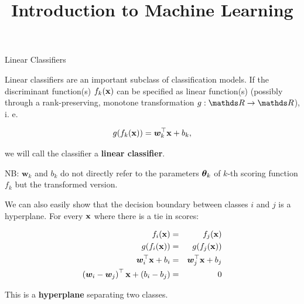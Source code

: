 \documentclass[11pt,compress,t,notes=noshow, xcolor=table]{beamer}
\title{Introduction to Machine Learning}
\begin{document}

\framebreak


\begin{vbframe}{Linear Classifiers}

Linear classifiers are an important subclass of classification models. 
If the discriminant function(s) $\fkx$ can be specified as linear function(s) (possibly through a rank-preserving,
monotone transformation $g: \R \to \R$), i. e. 

$$
  g(\fkx) = \bm{w}_k^\top \xv + b_k,
$$

we will call the classifier a \textbf{linear classifier}. 

\vfill

NB: $\bm{w}_k$ and $b_k$ do not directly refer to the parameters $\thetab_k$ 
of $k$-th scoring function $f_k$ but the transformed version. 

  

\framebreak
  

  
We can also easily show that the decision boundary between classes $i$ and $j$ is a hyperplane. For every $\xv$ where there is a tie in scores: 

\begin{eqnarray*}
  \fkx[i] &=& \fkx[j] \\
  g(\fkx[i]) &=& g(\fkx[j]) \\
  \bm{w}_i^\top \xv + b_i &=& \bm{w}_j^\top \xv + b_j \\
  \left(\bm{w}_i - \bm{w}_j\right)^\top \xv + \left(b_i - b_j\right) &=& 0 
\end{eqnarray*}

This is a \textbf{hyperplane} separating two classes. 




\end{vbframe}
\end{document}

